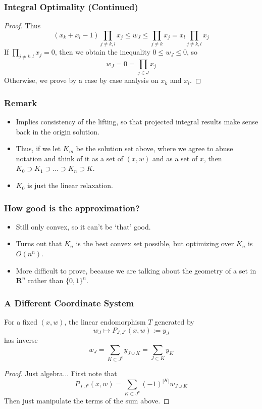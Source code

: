 \documentclass{beamer}
\begin{document}
\begin{frame}
    \frametitle{Integral Optimality (Continued)}

    \begin{proof}
    Thus
    \[ (x_k + x_l - 1) \prod_{j \neq k,l} x_j \leq w_J \leq \prod_{j \neq k} x_j = x_l \prod_{j \neq k,l} x_j \]
    If $\prod_{j \neq k,l} x_j = 0$, then we obtain the inequality $0 \leq w_J \leq 0$, so
    \[ w_J = 0 = \prod_{j \in J} x_j \]
    Otherwise, we prove by a case by case analysis on $x_k$ and $x_l$.
    \end{proof}
\end{frame}

\begin{frame}
    \frametitle{Remark}

    \begin{itemize}
        \item Implies consistency of the lifting, so that projected integral results make sense back in the origin solution.
        \item Thus, if we let $K_m$ be the solution set above, where we agree to abuse notation and think of it as a set of $(x,w)$ and as a set of $x$, then $K_0 \supset K_1 \supset \dots \supset K_n \supset K$.
        \item $K_0$ is just the linear relaxation.
    \end{itemize}
\end{frame}

\begin{frame}
    \frametitle{How good is the approximation?}

    \begin{itemize}
        \item Still only convex, so it can't be `that' good.
        \item Turns out that $K_n$ is the best convex set possible, but optimizing over $K_n$ is $O(n^n)$.
        \item More difficult to prove, because we are talking about the geometry of a set in $\mathbf{R}^n$ rather than $\{ 0, 1\}^n$.
    \end{itemize}
\end{frame}

\begin{frame}
    \frametitle{A Different Coordinate System}

    \begin{lemma}
        For a fixed $(x,w)$, the linear endomorphism $T$ generated by
        \[ w_J \mapsto P_{J,J^c}(x,w) := y_J \]
        has inverse
        \[ w_J = \sum_{K \subset J^c} y_{J \cup K} = \sum_{J \subset K} y_K \]
    \end{lemma}
    \begin{proof}
        Just algebra... First note that
        \[ P_{J,J^c}(x,w) = \sum_{K \subset J^c} (-1)^{|K|} w_{J \cup K} \]
        Then just manipulate the terms of the sum above.
    \end{proof}
\end{frame}
\end{document}
